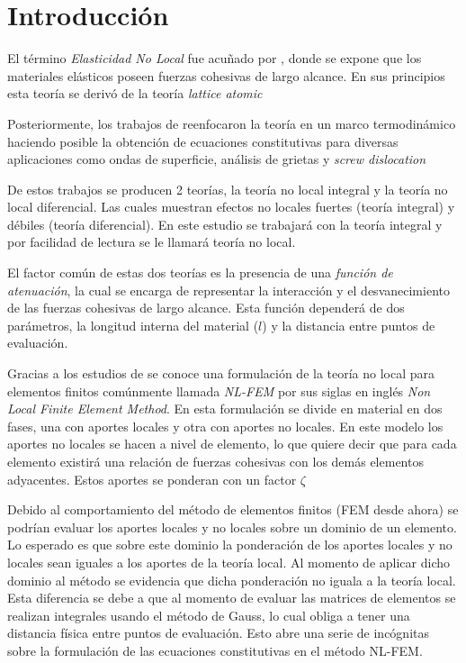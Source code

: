 \begin{comment}

\end{comment}

\section{Introducción}
\label{sc:intro}

El término \textit{Elasticidad No Local} fue acuñado por \textcite{Kroner1967}, donde se expone que los materiales elásticos poseen fuerzas cohesivas de largo alcance. En sus principios esta teoría se derivó de la teoría \textit{lattice atomic}

Posteriormente, los trabajos de \textcite{Eringen1987} reenfocaron la teoría en un marco termodinámico haciendo posible la obtención de ecuaciones constitutivas para diversas aplicaciones como ondas de superficie, análisis de grietas y \textit{screw dislocation}

De estos trabajos se producen 2 teorías, la teoría no local integral y la teoría no local diferencial. Las cuales muestran efectos no locales fuertes (teoría integral) y débiles (teoría diferencial). En este estudio se trabajará con la teoría integral y por facilidad de lectura se le llamará teoría no local.

El factor común de estas dos teorías es la presencia de una \textit{función de atenuación}, la cual se encarga de representar la interacción y el desvanecimiento de las fuerzas cohesivas de largo alcance. Esta función dependerá de dos parámetros, la longitud interna del material ($l$) y la distancia entre puntos de evaluación.

Gracias a los estudios de \textcite{Polizzotto2001} se conoce una formulación de la teoría no local para elementos finitos comúnmente llamada \textit{NL-FEM} por sus siglas en inglés \textit{Non Local Finite Element Method}. En esta formulación se divide en material en dos fases, una con aportes locales y otra con aportes no locales. En este modelo los aportes no locales se hacen a nivel de elemento, lo que quiere decir que para cada elemento existirá una relación de fuerzas cohesivas con los demás elementos adyacentes. Estos aportes se ponderan con un factor $\zeta$

Debido al comportamiento del método de elementos finitos (FEM desde ahora) se podrían evaluar los aportes locales y no locales sobre un dominio de un elemento. Lo esperado es que sobre este dominio la ponderación de los aportes locales y no locales sean iguales a los aportes de la teoría local. Al momento de aplicar dicho dominio al método se evidencia que dicha ponderación no iguala a la teoría local. Esta diferencia se debe a que al momento de evaluar las matrices de elementos se realizan integrales usando el método de Gauss, lo cual obliga a tener una distancia física entre puntos de evaluación. Esto abre una serie de incógnitas sobre la formulación de las ecuaciones constitutivas en el método NL-FEM.

